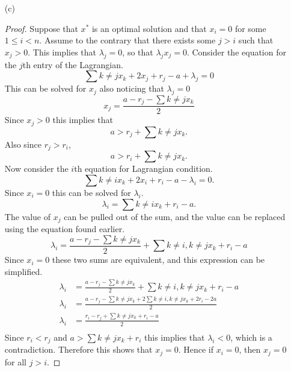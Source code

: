 \documentclass[11pt, oneside]{article}
\begin{document}
\begin{enumerate}
\begin{enumerate}
      \item[(c)]
        \begin{proof}
          Suppose that $x^*$ is an optimal solution and that $x_i = 0$ for some
          $1 \le i < n$.
          Assume to the contrary that there exists some $j > i$ such that
          $x_j > 0$.
          This implies that $\lambda_j = 0$, so that $\lambda_j x_j = 0$.
          Consider the equation for the $j$th entry of the Lagrangian.
          \[
            \sum{k \neq j}{}{x_k} + 2x_j + r_j - a + \lambda_j = 0
          \]
          This can be solved for $x_j$ also noticing that $\lambda_j = 0$
          \[
            x_j = \frac{a - r_j - \sum{k \neq j}{}{x_k}}{2}
          \]
          Since $x_j > 0$ this implies that
          \[
            a > r_j + \sum{k \neq j}{}{x_k}.
          \]
          Also since $r_j > r_i$,
          \[
            a > r_i + \sum{k \neq j}{}{x_k}.
          \]
          Now consider the $i$th equation for Lagrangian condition.
          \[
            \sum{k \neq i}{}{x_k} + 2x_i + r_i - a - \lambda_i = 0.
          \]
          Since $x_i = 0$ this can be solved for $\lambda_i$.
          \[
            \lambda_i = \sum{k \neq i}{}{x_k} + r_i - a.
          \]
          The value of $x_j$ can be pulled out of the sum, and the value can be
          replaced using the equation found earlier.
          \[
            \lambda_i = \frac{a - r_j - \sum{k \neq j}{}{x_k}}{2} + \sum{k \neq i, k \neq j}{}{x_k} + r_i - a
          \]
          Since $x_i = 0$ these two sums are equivalent, and this expression
          can be simplified.
          \begin{align*}
            \lambda_i &= \frac{a - r_j - \sum{k \neq j}{}{x_k}}{2} + \sum{k \neq i, k \neq j}{}{x_k} + r_i - a \\
            \lambda_i &= \frac{a - r_j - \sum{k \neq j}{}{x_k} + 2\sum{k \neq i, k \neq j}{}{x_k} + 2r_i - 2a }{2} \\
            \lambda_i &= \frac{r_i - r_j + \sum{k \neq j}{}{x_k} + r_i - a}{2} \\
          \end{align*}
          Since $r_i < r_j$ and $a > \sum{k \neq j}{}{x_k} + r_i$ this implies
          that $\lambda_i < 0$, which is a contradiction.
          Therefore this shows that $x_j = 0$.
          Hence if $x_i = 0$, then $x_j = 0$ for all $j > i$.
        \end{proof}


\end{enumerate}
\end{enumerate}
\end{document}
